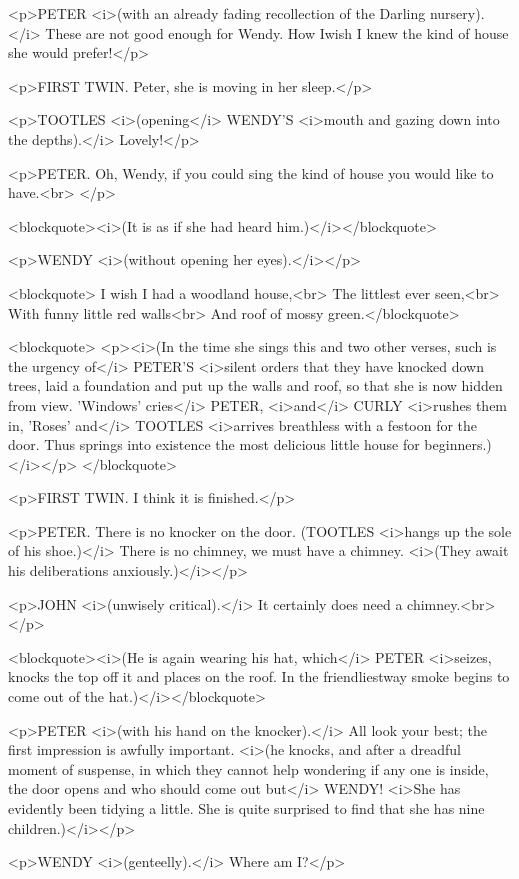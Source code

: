 <p>PETER <i>(with an already fading recollection of the Darling
nursery).</i> These are not good enough for Wendy. How Iwish I knew
the kind of house she would prefer!</p>

<p>FIRST TWIN. Peter, she is moving in her sleep.</p>

<p>TOOTLES <i>(opening</i> WENDY'S <i>mouth and gazing down into the
depths).</i> Lovely!</p>

<p>PETER. Oh, Wendy, if you could sing the kind of house you would
like to have.<br>
</p>

<blockquote><i>(It is as if she had heard him.)</i></blockquote>

<p>WENDY <i>(without opening her eyes).</i></p>

<blockquote>  I wish I had a woodland house,<br>
  The littlest ever seen,<br>
  With funny little red walls<br>
  And roof of mossy green.</blockquote>

<blockquote>
<p><i>(In the time she sings this and two other verses, such is the
urgency of</i> PETER'S <i>silent orders that they have knocked down
trees, laid a foundation and put up the walls and roof, so that she
is now hidden from view. 'Windows' cries</i> PETER, <i>and</i> CURLY
<i>rushes them in, 'Roses' and</i> TOOTLES <i>arrives breathless with
a festoon for the door. Thus springs into existence the most
delicious little house for beginners.)</i></p>
</blockquote>

<p>FIRST TWIN. I think it is finished.</p>

<p>PETER. There is no knocker on the door. (TOOTLES <i>hangs up the
sole of his shoe.)</i> There is no chimney, we must have a chimney.
<i>(They await his deliberations anxiously.)</i></p>

<p>JOHN <i>(unwisely critical).</i> It certainly does need a
chimney.<br>
</p>

<blockquote><i>(He is again wearing his hat, which</i> PETER
<i>seizes, knocks the top off it and places on the roof. In the
friendliestway smoke begins to come out of the hat.)</i></blockquote>

<p>PETER <i>(with his hand on the knocker).</i> All look your best;
the first impression is awfully important. <i>(he knocks, and after a
dreadful moment of suspense, in which they cannot help wondering if
any one is inside, the door opens and who should come out but</i>
WENDY! <i>She has evidently been tidying a little. She is quite
surprised to find that she has nine children.)</i></p>

<p>WENDY <i>(genteelly).</i> Where am I?</p>

